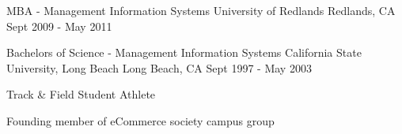 

\begin{cventries}

  \cventry
    {MBA - Management Information Systems} %
    {University of Redlands} %
    {Redlands, CA} %
    {Sept 2009 - May 2011} %
    {
      \begin{cvitems} %
      \end{cvitems}
    }

  \cventry
    {Bachelors of Science - Management Information Systems} %
    {California State University, Long Beach} %
    {Long Beach, CA} %
    {Sept 1997 - May 2003} %
    {
      \begin{cvitems} %
        \item {Track \& Field Student Athlete}
        \item {Founding member of eCommerce society campus group}
      \end{cvitems}
    }
\end{cventries}
